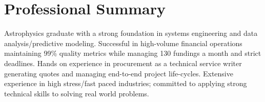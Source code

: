 \section{Professional Summary}
\resumeSubHeadingListStart
\item \small{
	Astrophysics graduate with a strong foundation in systems engineering and data analysis/predictive modeling. Successful in high-volume financial operations maintaining 99\% quality metrics while managing 130 fundings a month and strict deadlines. Hands on experience in procurement as a technical service writer generating quotes and managing end-to-end project life-cycles. Extensive experience in high stress/fast paced industries; committed to applying strong technical skills to solving real world problems.
}
\resumeSubHeadingListEnd

